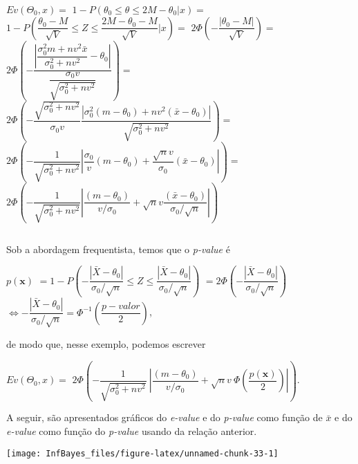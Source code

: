 \documentclass[
]{book}
\begin{document}
\(Ev(\Theta_0,x)=\) \(1-P\left(\theta_0\leq \theta\leq2M-\theta_0|x\right)=\) \(1-P\left(\dfrac{\theta_0-M}{\sqrt V}\leq Z\leq \dfrac{2M-\theta_0-M}{\sqrt V}|x\right)=\) \(2\Phi\left(-\dfrac{|\theta_0-M|}{\sqrt V}\right)=\) \(2\Phi\left(-\dfrac{\left|\dfrac{{\sigma}_0^2m+nv^2\bar{x}}{{\sigma}_0^2+nv^2}-\theta_0\right|}{\dfrac{{\sigma}_0 v}{\sqrt{{\sigma}_0^2+nv^2}}}\right)=\) \(2\Phi\left(-\dfrac{\sqrt{{\sigma}_0^2+nv^2}}{{\sigma}_0 v}\dfrac{|{\sigma}_0^2(m-\theta_0)+nv^2(\bar x-\theta_0)|}{\sqrt{{\sigma}_0^2+nv^2}}\right)=\) \(2\Phi\left(-\dfrac{1}{\sqrt{{\sigma}_0^2+nv^2}}\left|\dfrac{{\sigma}_0}{v}(m-\theta_0)+\dfrac{\sqrt n v}{{\sigma}_0}(\bar x-\theta_0)\right|\right)=\) \(2\Phi\left(-\dfrac{1}{\sqrt{{\sigma}_0^2+nv^2}}\left|\dfrac{(m-\theta_0)}{v/{\sigma}_0}+\sqrt nv\dfrac{(\bar x-\theta_0)}{{\sigma}_0/\sqrt n}\right|\right)\)

\(~\)

Sob a abordagem frequentista, temos que o \emph{p-value} é

\(p(\boldsymbol x)\)
\(= 1-P\left(-\dfrac{|\bar X-\theta_0|}{{\sigma}_0/\sqrt n}\leq Z \leq \dfrac{|\bar X-\theta_0|}{{\sigma}_0/\sqrt n}\right)\)
\(=2\Phi\left(-\dfrac{|\bar X-\theta_0|}{{\sigma}_0/\sqrt n}\right)\)
\(\Longleftrightarrow -\dfrac{|\bar X-\theta_0|}{{\sigma}_0/\sqrt n}=\Phi^{-1}\left(\dfrac{p-valor}{2}\right)\),

de modo que, nesse exemplo, podemos escrever

\(Ev(\Theta_0,x)=\) \(2\Phi\left(-\dfrac{1}{\sqrt{{\sigma}_0^2+nv^2}}~\left|\dfrac{(m-\theta_0)}{v/{\sigma}_0}+\sqrt nv~\Phi\left(\dfrac{p(\boldsymbol x)}{2}\right)\right|\right)\).

A seguir, são apresentados gráficos do \emph{e-value} e do \emph{p-value} como função de \(\bar{x}\) e do \emph{e-value} como função do \emph{p-value} usando da relação anterior.

\begin{center}\texttt{[image: InfBayes\_files/figure-latex/unnamed-chunk-33-1]} \end{center}
\end{document}
